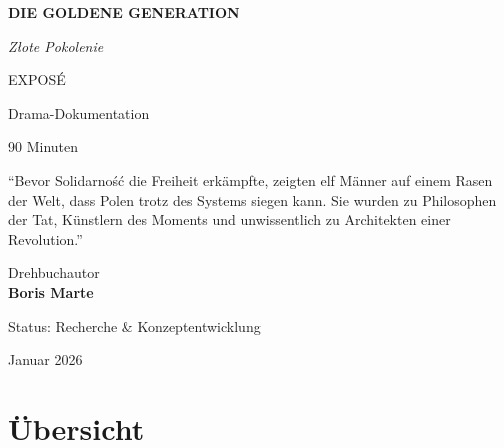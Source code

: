 \documentclass[11pt,a4paper]{book}
\newenvironment{thesenbox}{%
  \begin{mdframed}[
    linecolor=polishred,
    linewidth=2pt,
    backgroundcolor=polishred!5,
    innertopmargin=15pt,
    innerbottommargin=15pt
  ]
  \centering\large\itshape
}{%
  \end{mdframed}
}
\begin{document}

\begin{titlepage}
\centering
\vspace*{2cm}

{\Huge\bfseries\color{polishred} DIE GOLDENE GENERATION}

\vspace{0.5cm}

{\Large\itshape Złote Pokolenie}

\vspace{2cm}

{\large EXPOSÉ}

\vspace{1cm}

{\large Drama-Dokumentation}

\vspace{0.5cm}

{\large 90 Minuten}

\vspace{3cm}

\begin{thesenbox}
``Bevor Solidarność die Freiheit erkämpfte, zeigten elf Männer auf einem Rasen der Welt, dass Polen trotz des Systems siegen kann. Sie wurden zu Philosophen der Tat, Künstlern des Moments und unwissentlich zu Architekten einer Revolution.''
\end{thesenbox}

\vfill

{\large Drehbuchautor}\\[0.3cm]
{\Large\bfseries Boris Marte}

\vspace{1cm}

{\small Status: Recherche \& Konzeptentwicklung}

\vspace{0.5cm}

{\small Januar 2026}

\end{titlepage}


\tableofcontents


\chapter{Übersicht}
\end{document}
